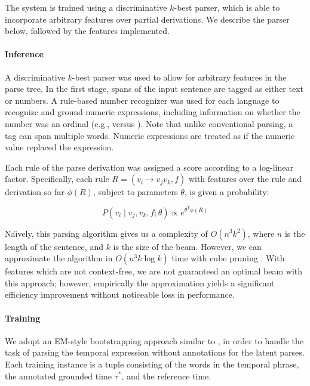 The system is trained using a discriminative $k$-best parser, which is able to
  incorporate arbitrary features over partial derivations.
We describe the parser below, followed by the features implemented.

\paragraph{Inference}
A discriminative $k$-best parser was used to allow for arbitrary features
  in the parse tree.
In the first stage, spans of the input sentence are tagged as either text
  or numbers.
A rule-based number recognizer was used for each language to recognize and
  ground numeric expressions, including information on whether the number was
  an ordinal (e.g.,  versus ).
Note that unlike conventional parsing, a tag can span multiple words.
Numeric expressions are treated as if the numeric value replaced the
  expression.

Each rule of the parse derivation was assigned a score according to a log-linear
  factor.
Specifically, each rule $R = (v_i \rightarrow v_j v_k, f)$
  with features over the rule and derivation so far
  $\phi(R)$, subject to parameters
  $\theta$, is given a probability:

\begin{equation}
P(v_i \mid v_j, v_k, f; \theta) \propto e^{ \theta^T \phi(R) }
\end{equation}

Na\"{\i}vely, this parsing algorithm gives us a complexity of $O(n^3 k^2)$,
  where $n$ is the length of the sentence, and $k$ is the size of the beam.
However, we can approximate the algorithm in $O(n^3 k \log k)$ time with
  cube pruning \cite{key:2007chiang-cubepruning}.
With features which are not context-free, we are not
  guaranteed an optimal beam with this approach; however, empirically
  the approximation yields a significant efficiency improvement without
  noticeable loss in performance.

\paragraph{Training}
We adopt an EM-style bootstrapping approach similar to \me, in order to handle
  the task of parsing the temporal expression without 
  annotations for the latent parses.
Each training instance is a tuple consisting of the words in the temporal
	phrase, the annotated grounded time $\tau^*$, and the reference time.

